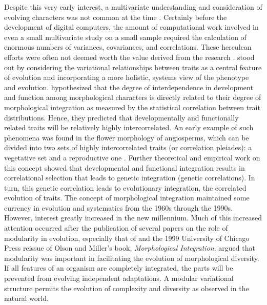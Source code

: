 \begin{refsection}
Despite this very early interest, a multivariate understanding and
consideration of evolving characters was not common at the time
\parencite{Simpson1958-gb}. Certainly before the
development of digital computers, the amount of computational work
involved in even a small multivariate study on a small sample required
the calculation of enormous numbers of variances, covariances, and
correlations. These herculean efforts were often not deemed worth the
value derived from the research
\parencite{Simpson1958-gb}.
\textcite{Olson1958-qk} stood out by
considering the variational relationships between traits as a central
feature of evolution and incorporating a more holistic, systems view of
the phenotype and evolution. \textcite{Olson1958-qk} 
hypothesized that the degree of interdependence in
development and function among morphological characters is directly
related to their degree of morphological integration as measured by the
statistical correlation between trait distributions. Hence, they
predicted that developmentally and functionally related traits will be
relatively highly intercorrelated. An early example of such phenomena
was found in the flower morphology of angiosperms, which can be divided
into two sets of highly intercorrelated traits (or correlation
pleiades): a vegetative set and a reproductive one
\parencite{Berg1960-tj}. Further theoretical and
empirical work on this concept \parencite{Cheverud1982-op, Cheverud1984-mi, Lande1979-by}
showed that developmental
and functional integration results in correlational selection that leads
to genetic integration (genetic correlations). In turn, this genetic
correlation leads to evolutionary integration, the correlated evolution
of traits. The concept of morphological integration maintained some
currency in evolution and systematics from the 1960s through the 1990s.
However, interest greatly increased in the new millennium. Much of this
increased attention occurred after the publication of several papers on
the role of modularity in evolution, especially that of \textcite{Wagner1996-ui}
 and the 1999 University of Chicago Press reissue of Olson and Miller's book,
\emph{Morphological Integration}.
\textcite{Wagner1996-ui} argued
that modularity was important in facilitating the evolution of
morphological diversity. If all features of an organism are completely
integrated, the parts will be prevented from evolving independent
adaptations. A modular variational structure permits the evolution of
complexity and diversity as observed in the natural world.


\end{refsection}
